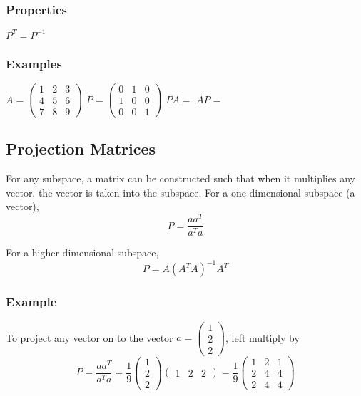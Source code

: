 \documentclass[12pt]{article}
\begin{document}
\subsubsection{Properties}
$P^T = P^{-1}$
\subsubsection{Examples}
$A = \begin{pmatrix}1 & 2 & 3 \\ 4 & 5 & 6 \\ 7 & 8 & 9\end{pmatrix}$
$P = \begin{pmatrix}0 & 1 & 0 \\ 1 & 0 & 0 \\ 0 & 0 & 1\end{pmatrix}$
$PA = $
$AP = $

\subsection{Projection Matrices}
For any subspace, a matrix can be constructed such that when it multiplies any vector, the vector is taken into the subspace. For a one dimensional subspace (a vector), \begin{equation*}
P=\frac{a a^T}{a^T a}
\end{equation*}

For a higher dimensional subspace, 
\begin{equation*}
P = A (A^T A)^{-1} A^T 
\end{equation*}

\subsubsection{Example}
To project any vector on to the vector $a = \begin{pmatrix} 1 \\ 2 \\ 2 \end{pmatrix}$, left multiply by
\begin{equation*}
P=\frac{aa^T}{a^Ta} = \frac{1}{9}\begin{pmatrix}1\\2\\2\end{pmatrix}\begin{pmatrix}1&2&2\end{pmatrix} = \frac{1}{9} \begin{pmatrix}
1&2&1\\
2&4&4\\
2&4&4 \end{pmatrix}
\end{equation*}
\end{document}
